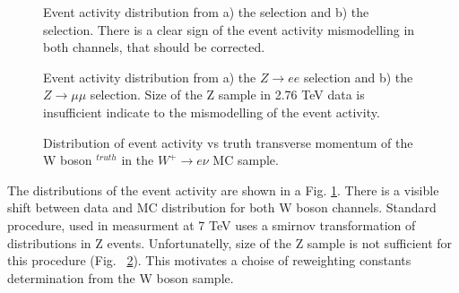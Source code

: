 \begin{figure}[!tbp]
\begin{minipage}[h]{0.5\linewidth}
\end{minipage}
\hfill
\begin{minipage}[h]{0.5\linewidth}
\end{minipage}
\caption{Event activity \sumet distribution from a) the \wenu selection and b) the \wmunu selection. There is a clear sign of the event activity mismodelling in both channels, that should be corrected.}
\label{HadrRecoil:UncorrSumet}
\end{figure}

\begin{figure}[!tbp]
\begin{minipage}[h]{0.5\linewidth}
\end{minipage}
\hfill
\begin{minipage}[h]{0.5\linewidth}
\end{minipage}
\caption{Event activity \sumet distribution from a) the $Z\to ee$ selection and b) the $Z\to \mu\mu$ selection. Size of the Z sample in 2.76 TeV data is insufficient indicate to the mismodelling of the event activity. }
\label{HadronRecoilSumetZ}
\end{figure}

\begin{figure}[!tbp]
\caption{Distribution of event activity \sumet vs truth transverse momentum of the W boson \ptw$^{truth}$ in the $W^{+} \to e\nu$ MC sample.  }
\label{HadrRecoil:SumetPt}
\end{figure}




The distributions of the event activity \sumet  are shown in a Fig. \ref{HadrRecoil:UncorrSumet}. There is a visible shift between data and MC distribution for both W boson channels. Standard procedure, used in \mtw measurment at 7 TeV uses a smirnov transformation of \sumet distributions in Z events. Unfortunatelly, size of the Z sample is not sufficient for this procedure (Fig. ~\ref{HadronRecoilSumetZ}). This motivates a choise of \sumet reweighting constants determination from the W boson sample. 

